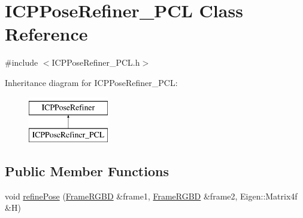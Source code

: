 \hypertarget{class_i_c_p_pose_refiner___p_c_l}{
\section{ICPPoseRefiner\_\-PCL Class Reference}
\label{class_i_c_p_pose_refiner___p_c_l}
}


{\ttfamily \#include $<$ICPPoseRefiner\_\-PCL.h$>$}

Inheritance diagram for ICPPoseRefiner\_\-PCL:\begin{figure}[H]
\begin{center}
\leavevmode
\includegraphics[height=2.000000cm]{class_i_c_p_pose_refiner___p_c_l}
\end{center}
\end{figure}
\subsection*{Public Member Functions}
\begin{DoxyCompactItemize}
\item 
void \hyperlink{class_i_c_p_pose_refiner___p_c_l_a0efdc4657c30bf0a171b0a012f4f0d8d}{refinePose} (\hyperlink{class_frame_r_g_b_d}{FrameRGBD} \&frame1, \hyperlink{class_frame_r_g_b_d}{FrameRGBD} \&frame2, Eigen::Matrix4f \&H)
\end{DoxyCompactItemize}
